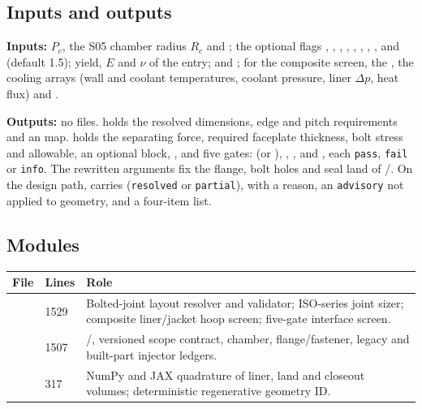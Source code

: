 \subsection{Inputs and outputs}

\textbf{Inputs:} $P_c$, the S05 chamber radius $R_c$ and ; the optional flags , , , , , , , ,  and  (default 1.5); yield, $E$ and $\nu$ of the  entry;  and ; for the composite screen, the , the cooling arrays (wall and coolant temperatures, coolant pressure, liner $\Delta p$, heat flux) and .

\textbf{Outputs:} no files.  holds the resolved dimensions, edge and pitch requirements and an  map.  holds the separating force, required faceplate thickness, bolt stress and allowable, an optional  block, , and five gates:  (or ), , ,  and , each \texttt{pass}, \texttt{fail} or \texttt{info}. The rewritten arguments fix the flange, bolt holes and seal land of /. On the design path,  carries  (\texttt{resolved} or \texttt{partial}),  with a reason, an \texttt{advisory}  not applied to geometry, and a four-item  list.

\subsection{Modules}

\begingroup\small
\begin{longtable}{@{}P{3.8cm}P{1.0cm}P{11.4cm}@{}}
\toprule
\textbf{File} & \textbf{Lines} & \textbf{Role} \\
\midrule
\endhead
{} & 1529 & Bolted-joint layout resolver and validator; ISO-series joint sizer; composite liner/jacket hoop screen; five-gate interface screen. \\
 & 1507 & /, versioned scope contract, chamber, flange/fastener, legacy and built-part injector ledgers. \\
 & 317 & NumPy and JAX quadrature of liner, land and closeout volumes; deterministic regenerative geometry ID. \\
\bottomrule
\end{longtable}
\endgroup

